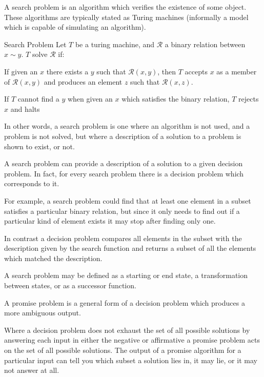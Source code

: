 A search problem is an algorithm which verifies the existence of some object. These algorithms are typically stated as Turing machines (informally a model which is capable of simulating an algorithm). 

\begin{defn}{Search Problem}
    Let $T$ be a turing machine, and $\mathcal{R}$ a binary relation between $x \sim y$.
    $T$ solve $\mathcal{R}$ if:
    
    If given an $x$ there exists a $y$ such that $\mathcal{R}(x,y)$, then $T$ accepts $x$ as a member of $\mathcal{R}(x,y)$ and produces an element $z$ such that $\mathcal{R}(x,z)$. 
    
    If $T$ cannot find a $y$ when given an $x$ which satisfies the binary relation, $T$ rejects $x$ and halts
\end{defn}    



In other words, a search problem is one where an algorithm is not used, and a problem is not solved, but where a description of a solution to a problem is shown to exist, or not. 


A search problem can provide a description of a solution to a given decision problem. In fact, for every search problem there is a decision problem which corresponds to it. 

For example, a search problem could find that at least one element in a subset satisfies a particular binary relation, but since it only needs to find out if a particular kind of element exists it may stop after finding only one. 

In contrast a decision problem compares all elements in the subset with the description given by the search function and returns a subset of all the elements which matched the description. 

A search problem may be defined as a starting or end state, a transformation between states, or as a successor function.



A promise problem is a general form of a decision problem which produces a more ambiguous output. 

Where a decision problem does not exhaust the set of all possible solutions by answering each input in either the negative or affirmative a promise problem acts on the set of all possible solutions. The output of a promise algorithm for a particular input can tell you which subset a solution lies in, it may lie, or it may not answer at all. 

